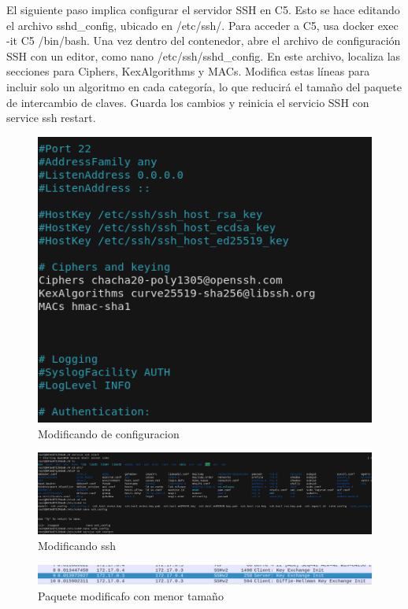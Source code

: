 \documentclass[letter,12pt]{article}
\begin{document}
El siguiente paso implica configurar el servidor SSH en C5. Esto se hace editando el archivo sshd\_config, ubicado en /etc/ssh/. Para acceder a C5, usa docker exec -it C5 /bin/bash. Una vez dentro del contenedor, abre el archivo de configuración SSH con un editor, como nano /etc/ssh/sshd\_config. En este archivo, localiza las secciones para Ciphers, KexAlgorithms y MACs. Modifica estas líneas para incluir solo un algoritmo en cada categoría, lo que reducirá el tamaño del paquete de intercambio de claves. Guarda los cambios y reinicia el servicio SSH con service ssh restart.
\begin{figure}[H]
        \centering
        \includegraphics[width=1\textwidth]{img/modificacion.png}  
        \caption{Modificando de configuracion}
    \end{figure}
    
\begin{figure}[H]
        \centering
        \includegraphics[width=1\textwidth]{img/restar.png}  
        \caption{Modificando ssh}
    \end{figure}

    \begin{figure}[H]
        \centering
        \includegraphics[width=1\textwidth]{img/final_paquete.png}  
        \caption{Paquete modificafo con menor tamaño}
    \end{figure}
\end{document}
